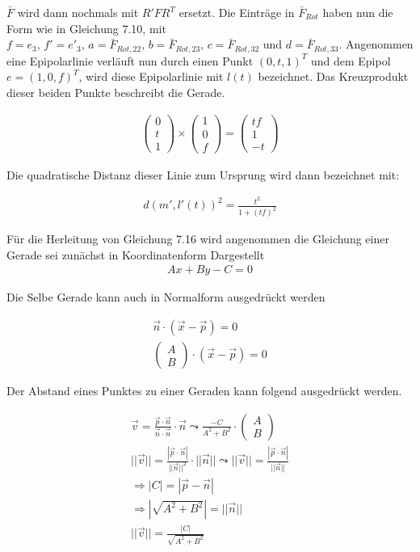 $\bar{F}$ wird dann nochmals mit $R'FR^T$ ersetzt. Die Einträge in $\bar{F}_{Rot}$ haben nun die Form wie in Gleichung 7.10, mit $f = e_3, \, f' = e'_3, \, a = \bar{F}_{Rot,22}, \, b = \bar{F}_{Rot,23}, \, c = \bar{F}_{Rot,32}$ und $d = \bar{F}_{Rot,33}$. Angenommen eine Epipolarlinie verläuft nun durch einen Punkt $(0,t,1)^T$ und dem Epipol $e = (1,0,f)^T$, wird diese Epipolarlinie mit $l(t)$ bezeichnet. Das Kreuzprodukt dieser beiden Punkte beschreibt die Gerade. 

\begin{gather}
	\begin{pmatrix}
	0\\t\\1
	\end{pmatrix} \times
	\begin{pmatrix}
	1\\0\\f
	\end{pmatrix} = 
	\begin{pmatrix}
	tf\\1\\-t
	\end{pmatrix}
\end{gather}

Die quadratische Distanz dieser Linie zum Ursprung wird dann bezeichnet mit:


\begin{gather}
	d(m',l'(t))^2 = \frac{t^2}{1+(tf)^2}
\end{gather}

Für die Herleitung von Gleichung 7.16 wird angenommen die Gleichung einer Gerade sei zunächst in Koordinatenform Dargestellt 
\begin{gather}
	Ax+By-C = 0
\end{gather}

Die Selbe Gerade kann auch in Normalform ausgedrückt werden

\begin{gather}
\vec{n}\cdot (\vec{x} - \vec{p}) = 0\\
	\begin{pmatrix}
	A\\B
	\end{pmatrix}
	\cdot
	(\vec{x} - \vec{p}) = 0
\end{gather} 

Der Abstand eines Punktes zu einer Geraden kann folgend ausgedrückt werden.

\begin{gather}
	\vec{v} = \frac{\vec{p} \cdot \vec{n}}{\vec{n} \cdot \vec{n}} \cdot \vec{n}
	\leadsto \frac{-C}{A^2+B^2} \cdot \begin{pmatrix}
	A\\B
	\end{pmatrix}\\
	||\vec{v}|| = \frac{|\vec{p} \cdot \vec{n}|}{||\vec{n}||^2} \cdot ||\vec{n}|| \leadsto ||\vec{v}|| = \frac{|\vec{p} \cdot \vec{n}|}{||\vec{n}||}\\
	\Rightarrow |C| = |\vec{p} - \vec{n}| \\
	\Rightarrow |\sqrt{A^2+B^2}| = ||\vec{n}||\\
	||\vec{v}|| = \frac{|C|}{\sqrt{A^2+B^2}}
\end{gather}

